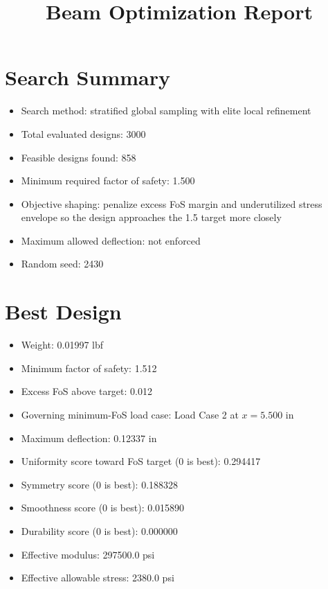 \documentclass[11pt]{article}
\title{Beam Optimization Report}
\date{}
\begin{document}
\maketitle

\section*{Search Summary}
\begin{itemize}
\item Search method: stratified global sampling with elite local refinement
\item Total evaluated designs: 3000
\item Feasible designs found: 858
\item Minimum required factor of safety: 1.500
\item Objective shaping: penalize excess FoS margin and underutilized stress envelope so the design approaches the 1.5 target more closely
\item Maximum allowed deflection: not enforced
\item Random seed: 2430
\end{itemize}

\section*{Best Design}
\begin{itemize}
\item Weight: 0.01997 lbf
\item Minimum factor of safety: 1.512
\item Excess FoS above target: 0.012
\item Governing minimum-FoS load case: Load Case 2 at $x=5.500$ in
\item Maximum deflection: 0.12337 in
\item Uniformity score toward FoS target (0 is best): 0.294417
\item Symmetry score (0 is best): 0.188328
\item Smoothness score (0 is best): 0.015890
\item Durability score (0 is best): 0.000000
\item Effective modulus: 297500.0 psi
\item Effective allowable stress: 2380.0 psi
\end{itemize}
\end{document}
